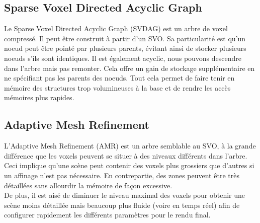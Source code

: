 \documentclass[12pt,a4paper,twoside]{article}
\begin{document}
    \begin{figure}[H]
    \end{figure}

    \subsection{Sparse Voxel Directed Acyclic Graph}

    Le Sparse Voxel Directed Acyclic Graph (SVDAG) est un arbre de voxel compressé. Il peut être construit à partir d'un SVO.
    Sa particularité est qu'un noeud peut être pointé par plusieurs parents, évitant ainsi de stocker plusieurs noeuds s'ils sont identiques.
    Il est également acyclic, nous pouvons descendre dans l'arbre mais pas remonter. Cela offre un gain de stockage supplémentaire en ne spécifiant pas les parents des noeuds.
    Tout cela permet de faire tenir en mémoire des structures trop volumineuses à la base et de rendre les accès mémoires plus rapides.

    \begin{figure}[H]
    \end{figure}

    \begin{figure}[H]
    \end{figure}
    \newpage
    \subsection{Adaptive Mesh Refinement}

    L'Adaptive Mesh Refinement (AMR) est un arbre semblable au SVO, à la grande différence que les voxels peuvent se situer à des niveaux différents dans l'arbre.
    Ceci implique qu'une scène peut contenir des voxels plus grossiers que d'autres si un affinage n'est pas nécessaire.
    En contrepartie, des zones peuvent être très détaillées sans allourdir la mémoire de façon excessive. \\
    De plus, il est aisé de diminuer le niveau maximal des voxels pour obtenir une scène moins détaillée
    mais beaucoup plus fluide (voire en temps réel) afin de configurer rapidement les différents paramètres pour le rendu final.
\end{document}
